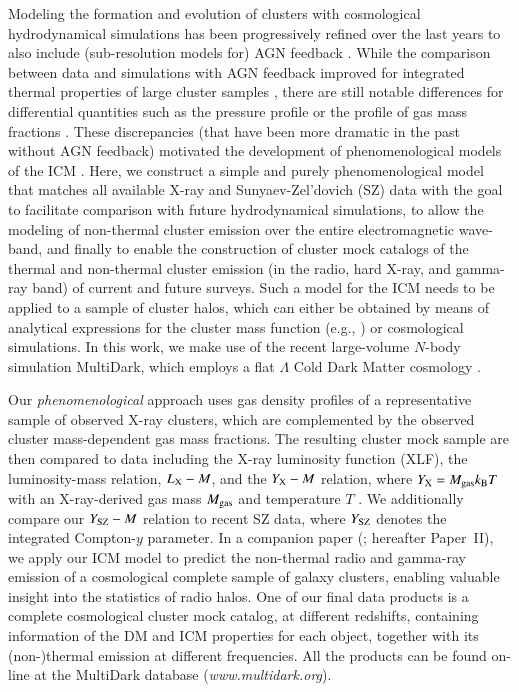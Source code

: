 \documentclass[useAMS,usenatbib]{mn2e}
\begin{document}
{  Modeling the formation and evolution of clusters with cosmological
  hydrodynamical simulations has been progressively refined over the last years
  to also include (sub-resolution models for) AGN feedback
  \citep[e.g.,][]{2007MNRAS.380..877S, 2008MNRAS.387.1403S, 2008ApJ...687L..53P,
    2012MNRAS.420.2662D, 2012MNRAS.424..190G, 2013MNRAS.428.2366V}. While the
  comparison between data and simulations with AGN feedback improved for integrated
  thermal properties of large cluster samples
  \citep{2012ApJ...758...74B,2012ApJ...758...75B}, there are still notable
  differences for differential quantities such as the pressure profile
  \citep{2013A&A...550A.131P} or the profile of gas mass fractions
  \citep{2012arXiv1209.4082B}. These discrepancies (that have been more dramatic
  in the past without AGN feedback) motivated the development of
  phenomenological models of the ICM \citep[e.g.,][]{2005ApJ...634..964O,
    2012MNRAS.422..686C}. Here, we construct a simple and purely
  phenomenological model that matches all available X-ray and Sunyaev-Zel'dovich
  (SZ) data with the goal to facilitate comparison with future hydrodynamical
  simulations, to allow the modeling of non-thermal cluster emission over the
  entire electromagnetic wave-band, and finally to enable the construction of
  cluster mock catalogs of the thermal and non-thermal cluster emission (in the
  radio, hard X-ray, and gamma-ray band) of current and future surveys. Such a
  model for the ICM needs to be applied to a sample of cluster halos, which
  can either be obtained by means of analytical expressions for the cluster mass
  function (e.g., \citealp{2001MNRAS.321..372J}) or cosmological
  simulations. In this work, we make use of the recent large-volume $N$-body
  simulation MultiDark, which employs a flat $\Lambda$ Cold Dark Matter cosmology
  \citep{2011arXiv1104.5130P}.

  Our \emph{phenomenological} approach uses gas density profiles of a
  representative sample of observed X-ray clusters, which are complemented by
  the observed cluster mass-dependent gas mass fractions. The resulting cluster
  mock sample are then compared to data including the X-ray luminosity function
  (XLF), the luminosity-mass relation, $L_{{\mathrm{X}}}- M$, and the $Y_{{\mathrm{X}}}-M$
  relation, where $Y_{{\mathrm{X}}}=M_{\mathrm{gas}}k_{{\mathrm{B}}}T$ with an X-ray-derived
  gas mass $M_{{\mathrm{gas}}}$ and temperature $T$ \citep{2006ApJ...650..128K}. We
  additionally compare our $Y_{{\mathrm{SZ}}}-M$ relation to recent SZ data, where
  $Y_{\mathrm{SZ}}$ denotes the integrated Compton-$y$ parameter.  In a companion
  paper (\citealp{paper2}; hereafter Paper~II), we apply our ICM model to
  predict the non-thermal radio and gamma-ray emission of a cosmological
  complete sample of galaxy clusters, enabling valuable insight into the
  statistics of radio halos.  One of our final data products is a complete
  cosmological cluster mock catalog, at different redshifts, containing
  information of the DM and ICM properties for each object, together with
  its (non-)thermal emission at different frequencies. All the products can
    be found on-line at the MultiDark database (\textit{www.multidark.org}).

}
\end{document}
